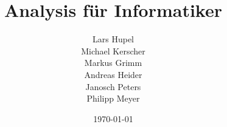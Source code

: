 


\title{Analysis für Informatiker}
\author{Lars Hupel\\ Michael Kerscher\\ Markus Grimm\\ Andreas Heider \\ Janosch Peters \\ Philipp Meyer}
\date{\today}



\maketitle

\newpage
\listoftodos
\newpage
\tableofcontents
\newpage
{}
{}
\listoflectures
\newpage












\newpage
{}
{}



